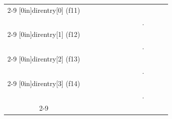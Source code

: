 \documentclass[11pt,a4paper]{article}
\begin{document}
\begin{center}

\begin{tabular}{ c   | m{0.45cm} | m{0.45cm} | m{0.45cm} | m{0.45cm} | m{0.45cm} | m{0.45cm} | m{0.45cm} | m{0.45cm} | c | m{0.45cm} | m{0.45cm} | m{0.45cm} | }
\cline{2-9} \cline{11-13}
\multirow[c]{2}{*}[0in]{direntry[0] (f11)}  & & & & & & & & &     & & & \\
                                            & & & & & & & & &  .  & & & \\
\cline{2-9} \cline{11-13}
\multirow[c]{2}{*}[0in]{direntry[1] (f12)}  & & & & & & & & &     & & & \\
                                            & & & & & & & & &  .  & & & \\
\cline{2-9} \cline{11-13}
\multirow[c]{2}{*}[0in]{direntry[2] (f13)}  & & & & & & & & &     & & & \\
                                            & & & & & & & & &  .  & & & \\
\cline{2-9} \cline{11-13}
\multirow[c]{2}{*}[0in]{direntry[3] (f14)}  & & & & & & & & &     & & & \\
                                            & & & & & & & & &  .  & & & \\
\cline{2-9} \cline{11-13}
\end{tabular}


\bigskip

\bigskip



\end{center}
\end{document}
